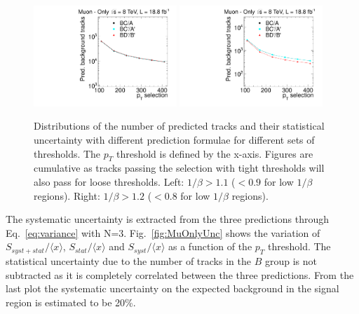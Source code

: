 \begin{figure}
\begin{center}
\includegraphics[clip=false, trim=0.0cm 0cm 0.0cm 0cm, width=0.48\textwidth]{figures/muonly/Data8TeVCollisionPrediction_TOF110}
\includegraphics[clip=false, trim=0.0cm 0cm 0.0cm 0cm, width=0.48\textwidth]{figures/muonly/Data8TeVCollisionPrediction_TOF120}
\caption[Distributions of the number of predicted tracks with different prediction formulae for different sets of thresholds in the \muononly\ analysis.]
{Distributions of the number of predicted tracks and their statistical uncertainty with different prediction formulae for different sets of thresholds.
The $p_{T}$ threshold is defined by the x-axis.
Figures are cumulative as tracks passing the selection with tight thresholds will also pass for loose thresholds.
Left: $1/\beta>1.1$ ($<0.9$ for low $1/\beta$ regions). Right: $1/\beta>1.2$ ($<0.8$ for low $1/\beta$ regions).}
\label{fig:MuOnlycorrelation}
\end{center}
\end{figure}

The systematic uncertainty is extracted from the three predictions
through Eq.~\ref{eq:variance} with N=3.
Fig.~\ref{fig:MuOnlyUnc} shows the variation of
$S_{syst+stat}/\langle x \rangle $, $S_{stat}/ \langle x \rangle $ and $S_{syst}/ \langle x \rangle $
as a function of the $p_T$ threshold. The statistical uncertainty due to the number of tracks in the $B$ group is not subtracted as it is completely correlated
between the three predictions. From the last plot
the systematic uncertainty on the expected background in the signal
region is estimated to be 20\%.

